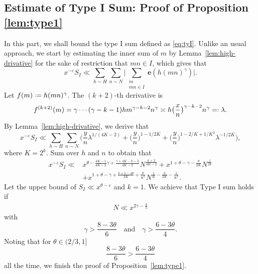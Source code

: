 \documentclass[12pt, reqno, twoside, letterpaper]{amsart}
\numberwithin{equation}{section}
\newcommand{\e}{\ensuremath{\mathbf{e}}}
\theoremstyle{customthm}
\theoremstyle{customrem}
\newcommand*{\defeq}{\mathrel{\vcenter{\baselineskip0.5ex \lineskiplimit0pt
			\hbox{\scriptsize.}\hbox{\scriptsize.}}}%
	=}
\newcommand*{\eqdef}{=\mathrel{\vcenter{\baselineskip0.5ex \lineskiplimit0pt
			\hbox{\scriptsize.}\hbox{\scriptsize.}}}%
}
\begin{document}
	
\subsection{Estimate of Type I Sum: Proof of Proposition \ref{lem:type1}}\label{Estimate of Type I Sum}
In this part, we shall bound the type I sum defined as \eqref{eq:tyI}. Unlike an usual approach, we start by estimating the inner sum of $m$ by Lemma~\ref{lem:high-drivative} for the sake of restriction that $mn \in I$, which gives that
$$
x^{-\varepsilon}S_I \ll \sum_{h \sim H} \sum_{n \sim N} \Big| \sum_{ \substack{m \\ mn \in I}}  \e(h(mn)^\gamma) \Big|.
$$
Let $f(m) \defeq h(mn)^{\gamma}$. The $(k+2)$-th derivative is 
$$
f^{(k+2)}(m)=\gamma \cdots (\gamma-k-1)hm^{\gamma-k-2}n^{\gamma} \asymp h \big( \frac{x}{n} \big)^{\gamma-k-2} n^{\gamma} \eqdef \lambda.
$$
By Lemma~\ref{lem:high-drivative}, we derive that
$$
x^{-\varepsilon}S_I \ll \sum_{h \sim H} \sum_{n \sim N} \bigg( \frac{y}{n} \lambda^{1/(4K-2)} + \big( \frac{y}{n} \big)^{1-1/2K} + \big( \frac{y}{n} \big)^{1-2/K+1/K^2} \lambda^{-1/2K} \bigg), 
$$
where $K=2^k$. Sum over $h$ and $n$ to obtain that
\begin{align*}
\nonumber
x^{-\varepsilon}S_I \ll &x^{\theta  - \frac{4K-1}{4K-2}\gamma + \frac{\gamma + 4K-k-3}{4K-2}}N^{\frac{k+2}{4K-2}} + x^{1+\theta - \gamma -\frac{\theta}{2K}}N^{\frac{1}{2k}} \\
&+ x^{1+\theta - \gamma + \frac{k+1 - 4\theta}{2K} + \frac{\theta}{K^2}}N^{\frac{1}{K}-\frac{k}{2K}-\frac{1}{K^2}}.
\end{align*}
Let the upper bound of $S_I \ll x^{\theta-\varepsilon}$ and $k=1$. We achieve that Type I sum holds if 
\begin{align*}
N \ll x^{2\gamma -\frac{4}{3}} 
\end{align*}
with 
$$
\gamma > \frac{8-3\theta}{6} \quad \text{and} \quad \gamma > \frac{6-3\theta}{4}.
$$
Noting that for $\theta \in (2/3,1]$
$$
\frac{8-3\theta}{6} > \frac{6-3\theta}{4}
$$
all the time, we finish the proof of Proposition~\ref{lem:type1}.
\end{document}
